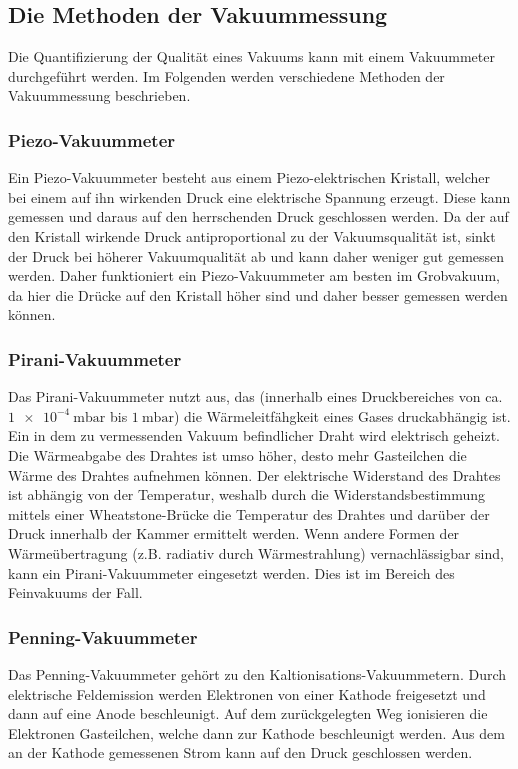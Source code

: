 \subsection{Die Methoden der Vakuummessung}
Die Quantifizierung der Qualität eines Vakuums kann mit einem Vakuummeter durchgeführt werden.
Im Folgenden werden verschiedene Methoden der Vakuummessung beschrieben.

\subsubsection*{Piezo-Vakuummeter}
Ein Piezo-Vakuummeter besteht aus einem Piezo-elektrischen Kristall, welcher bei einem auf ihn wirkenden
Druck eine elektrische Spannung erzeugt. Diese kann gemessen und daraus auf den herrschenden Druck geschlossen
werden. Da der auf den Kristall wirkende Druck antiproportional zu der Vakuumsqualität ist, sinkt der Druck bei
höherer Vakuumqualität ab und kann daher weniger gut gemessen werden. Daher funktioniert ein
Piezo-Vakuummeter am besten im Grobvakuum, da hier die Drücke auf den Kristall höher sind und daher besser
gemessen werden können.
\subsubsection*{Pirani-Vakuummeter}
Das Pirani-Vakuummeter nutzt aus, das (innerhalb eines Druckbereiches von ca. $\SI{1e-4}{\milli\bar}$ bis $\SI{1}{\milli\bar}$)
die Wärmeleitfähgkeit eines Gases druckabhängig ist. Ein in dem zu vermessenden Vakuum befindlicher Draht wird elektrisch geheizt.
Die Wärmeabgabe des Drahtes ist umso höher, desto mehr Gasteilchen die Wärme des Drahtes
aufnehmen können. Der elektrische Widerstand des Drahtes ist abhängig von der Temperatur, weshalb
durch die Widerstandsbestimmung mittels einer Wheatstone-Brücke die Temperatur des Drahtes und darüber der Druck
innerhalb der Kammer ermittelt werden. Wenn andere Formen der Wärmeübertragung (z.B. radiativ durch Wärmestrahlung)
vernachlässigbar sind, kann ein Pirani-Vakuummeter eingesetzt werden. Dies ist im Bereich des Feinvakuums der Fall.

\subsubsection*{Penning-Vakuummeter}
Das Penning-Vakuummeter gehört zu den Kaltionisations-Vakuummetern. Durch elektrische Feldemission werden
Elektronen von einer Kathode freigesetzt und dann auf eine Anode beschleunigt. Auf dem zurückgelegten Weg
ionisieren die Elektronen Gasteilchen, welche dann zur Kathode beschleunigt werden. Aus dem an der Kathode
gemessenen Strom kann auf den Druck geschlossen werden.

